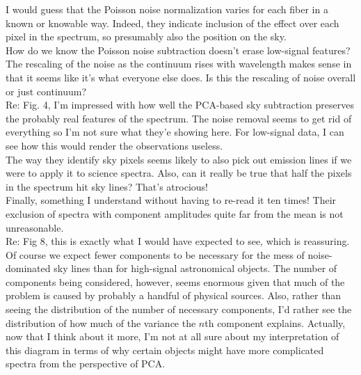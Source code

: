 \documentclass[12pt]{article}
\newcommand{\textul}{\underline}
\begin{document}
I would guess that the Poisson noise normalization varies for each fiber in a known or knowable way.  Indeed, they indicate inclusion of the effect over each pixel in the spectrum, so presumably also the position on the sky.\\
How do we know the Poisson noise subtraction doesn't erase low-signal features?\\
The rescaling of the noise as the continuum rises with wavelength makes sense in that it seems like it's what everyone else does.  Is this the rescaling of noise overall or just continuum?\\
Re: Fig. 4, I'm impressed with how well the PCA-based sky subtraction preserves the probably real features of the spectrum.  The noise removal seems to get rid of everything so I'm not sure what they'e showing here.  For low-signal data, I can see how this would render the observations useless.\\
The way they identify sky pixels seems likely to also pick out emission lines if we were to apply it to science spectra.  Also, can it really be true that half the pixels in the spectrum hit sky lines?  That's atrocious!\\
Finally, something I understand without having to re-read it ten times!  Their exclusion of spectra with component amplitudes quite far from the mean is not unreasonable.\\
Re: Fig 8, this is exactly what I would have expected to see, which is reassuring.  Of course we expect fewer components to be necessary for the mess of noise-dominated sky lines than for high-signal astronomical objects.  The number of components being considered, however, seems enormous given that much of the problem is caused by probably a handful of physical sources.  Also, rather than seeing the distribution of the number of necessary components, I'd rather see the distribution of how much of the variance the $n$th component explains.  Actually, now that I think about it more, I'm not at all sure about my interpretation of this diagram in terms of why certain objects might have more complicated spectra from the perspective of PCA.\\
\end{document}
